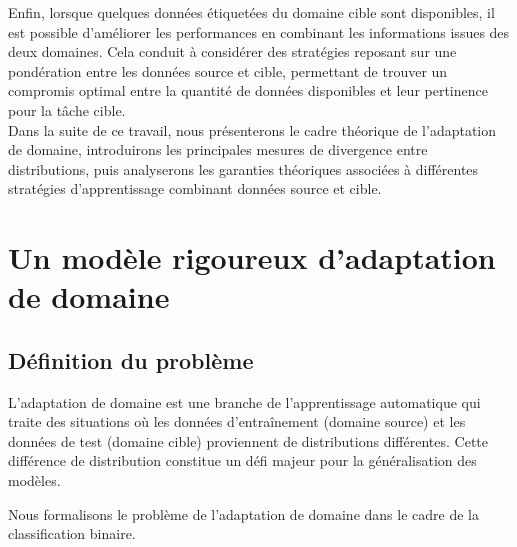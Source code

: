 \documentclass[a4paper,12pt]{article}
\theoremstyle{definition}
\theoremstyle{remark}
\begin{document}
Enfin, lorsque quelques données étiquetées du domaine cible sont disponibles, il est possible d’améliorer les performances en combinant les informations issues des deux domaines. Cela conduit à considérer des stratégies reposant sur une pondération entre les données source et cible, permettant de trouver un compromis optimal entre la quantité de données disponibles et leur pertinence pour la tâche cible.\\

Dans la suite de ce travail, nous présenterons le cadre théorique de l’adaptation de domaine, introduirons les principales mesures de divergence entre distributions, puis analyserons les garanties théoriques associées à différentes stratégies d’apprentissage combinant données source et cible.\\



\newpage
\section{Un modèle rigoureux d’adaptation de domaine}

\subsection{Définition du problème}

L’adaptation de domaine est une branche de l’apprentissage automatique qui traite des situations où les données d’entraînement (domaine source) et les données de test (domaine cible) proviennent de distributions différentes. Cette différence de distribution constitue un défi majeur pour la généralisation des modèles.

Nous formalisons le problème de l’adaptation de domaine dans le cadre de la classification binaire.
\end{document}
